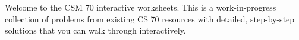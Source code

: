 Welcome to the CSM 70 interactive worksheets. This is a work-in-progress collection of problems from existing CS 70 resources with detailed, step-by-step solutions that you can walk through interactively.
